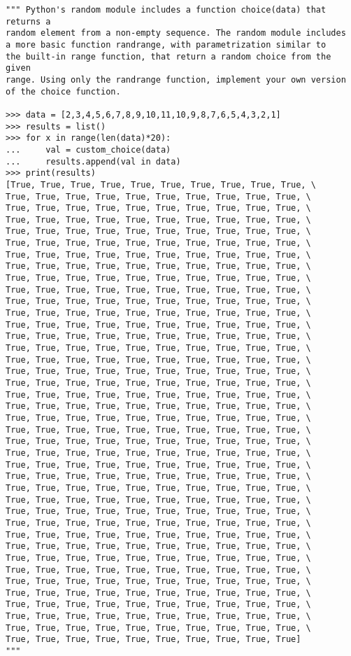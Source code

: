 \begin{lstlisting}[title=Exercise R-1.12 Doctest]
""" Python's random module includes a function choice(data) that returns a
random element from a non-empty sequence. The random module includes
a more basic function randrange, with parametrization similar to
the built-in range function, that return a random choice from the given
range. Using only the randrange function, implement your own version
of the choice function.

>>> data = [2,3,4,5,6,7,8,9,10,11,10,9,8,7,6,5,4,3,2,1]
>>> results = list()
>>> for x in range(len(data)*20):
...     val = custom_choice(data)
...     results.append(val in data)
>>> print(results)
[True, True, True, True, True, True, True, True, True, True, \
True, True, True, True, True, True, True, True, True, True, \
True, True, True, True, True, True, True, True, True, True, \
True, True, True, True, True, True, True, True, True, True, \
True, True, True, True, True, True, True, True, True, True, \
True, True, True, True, True, True, True, True, True, True, \
True, True, True, True, True, True, True, True, True, True, \
True, True, True, True, True, True, True, True, True, True, \
True, True, True, True, True, True, True, True, True, True, \
True, True, True, True, True, True, True, True, True, True, \
True, True, True, True, True, True, True, True, True, True, \
True, True, True, True, True, True, True, True, True, True, \
True, True, True, True, True, True, True, True, True, True, \
True, True, True, True, True, True, True, True, True, True, \
True, True, True, True, True, True, True, True, True, True, \
True, True, True, True, True, True, True, True, True, True, \
True, True, True, True, True, True, True, True, True, True, \
True, True, True, True, True, True, True, True, True, True, \
True, True, True, True, True, True, True, True, True, True, \
True, True, True, True, True, True, True, True, True, True, \
True, True, True, True, True, True, True, True, True, True, \
True, True, True, True, True, True, True, True, True, True, \
True, True, True, True, True, True, True, True, True, True, \
True, True, True, True, True, True, True, True, True, True, \
True, True, True, True, True, True, True, True, True, True, \
True, True, True, True, True, True, True, True, True, True, \
True, True, True, True, True, True, True, True, True, True, \
True, True, True, True, True, True, True, True, True, True, \
True, True, True, True, True, True, True, True, True, True, \
True, True, True, True, True, True, True, True, True, True, \
True, True, True, True, True, True, True, True, True, True, \
True, True, True, True, True, True, True, True, True, True, \
True, True, True, True, True, True, True, True, True, True, \
True, True, True, True, True, True, True, True, True, True, \
True, True, True, True, True, True, True, True, True, True, \
True, True, True, True, True, True, True, True, True, True, \
True, True, True, True, True, True, True, True, True, True, \
True, True, True, True, True, True, True, True, True, True, \
True, True, True, True, True, True, True, True, True, True, \
True, True, True, True, True, True, True, True, True, True]
"""
\end{lstlisting}
